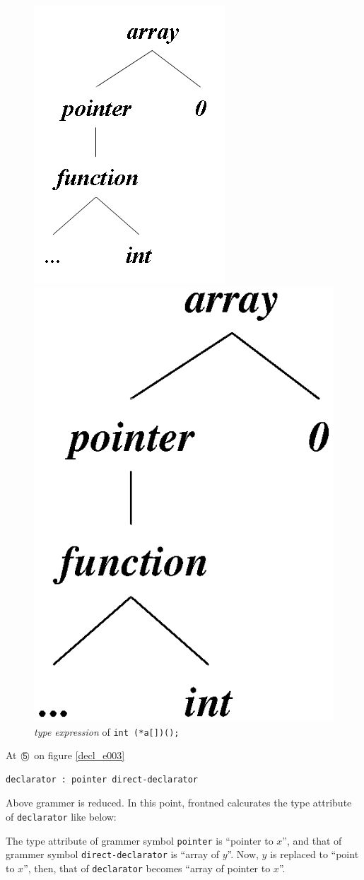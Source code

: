 \begin{figure}[htbp]
\begin{center}
\begin{htmlonly}
\includegraphics[width=0.5\linewidth,height=0.6\linewidth]{decl004.png}
\end{htmlonly} 
\begin{latexonly}
\includegraphics[width=0.5\linewidth,height=0.6\linewidth]{decl004.eps}
\end{latexonly}
\caption{{\em type expression} of {\tt{int (*a[])();}}}
\label{decl_e004}
\end{center}
\end{figure}

At ${\MARU{\tt 5}}$ on figure \ref{decl_e003}
\begin{verbatim}
declarator : pointer direct-declarator
\end{verbatim}
Above grammer is reduced. In this point, frontned calcurates
the type attribute of {\tt{declarator}} like below:

The type attribute of grammer symbol {\tt{pointer}} 
is ``pointer to $x$'', and that of grammer symbol
{\tt{direct-declarator}} is ``array of $y$''.
Now, $y$ is replaced to ``point to $x$'',
then, that of {\tt{declarator}} becomes
``array of pointer to $x$''.

